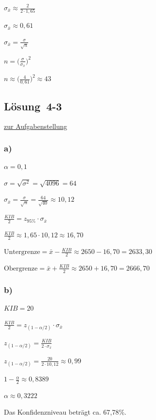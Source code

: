 \documentclass[
  11pt,
  ngerman,
  a4paper,
]{report}
\begin{document}
\(\sigma_{\bar{x}} \approx \frac{2}{2 \cdot 1{,}65}\)

\(\sigma_{\bar{x}} \approx 0{,}61\)

\(\sigma_{\bar{x}}=\frac{\sigma}{\sqrt{n}}\)

\(n = \big(\frac{\sigma}{\sigma_{\bar{x}}}\big)^2\)

\(n \approx \big(\frac{4}{0{,}61}\big)^2\approx43\)

\hypertarget{loesung-4-3}{%
\subsection{Lösung~4-3}\label{loesung-4-3}}

\protect\hyperlink{aufgabe-4-3}{zur Aufgabenstellung}

\hypertarget{a-16}{%
\subsubsection{a)}\label{a-16}}

\(\alpha=0{,}1\)

\(\sigma=\sqrt{\sigma^2}=\sqrt{4096}=64\)

\(\sigma_{\bar{x}}=\frac{\sigma}{\sqrt{n}}=\frac{64}{\sqrt{40}}\approx10{,}12\)

\(\frac{\mathit{KIB}}{2}=z_{95\%} \cdot \sigma_{\bar{x}}\)

\(\frac{\mathit{KIB}}{2}\approx 1{,}65 \cdot 10{,}12\approx16{,}70\)

\(\textrm{Untergrenze} = \bar{x} - \frac{\mathit{KIB}}{2} \approx 2650 - 16{,}70 = 2633{,}30\)

\(\textrm{Obergrenze} = \bar{x} + \frac{\mathit{KIB}}{2} \approx 2650 + 16{,}70 = 2666{,}70\)

\hypertarget{b-17}{%
\subsubsection{b)}\label{b-17}}

\(\mathit{KIB}=20\)

\(\frac{\mathit{KIB}}{2}=z_{(1-\alpha/2)} \cdot \sigma_{\bar{x}}\)

\(z_{(1-\alpha/2)}=\frac{\mathit{KIB}}{2\cdot \sigma_{\bar{x}}}\)

\(z_{(1-\alpha/2)}=\frac{20}{2 \cdot 10{,}12}\approx0{,}99\)

\(1-\frac{\alpha}{2}\approx0{,}8389\)

\(\alpha\approx 0{,}3222\)

Das Konfidenzniveau beträgt ca. 67,78\%.
\end{document}
